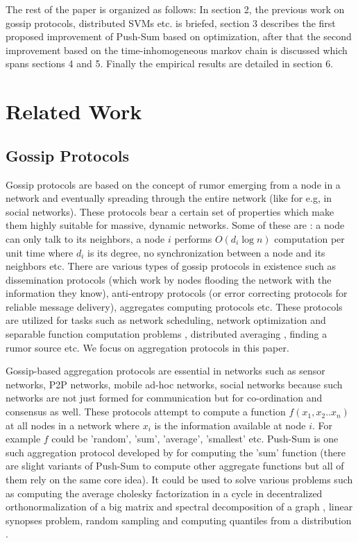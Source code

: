 \documentclass[runningheads,a4paper]{llncs}
\begin{document}
The rest of the paper is organized as follows: In section 2, the previous work on gossip protocols, distributed SVMs etc. is briefed, section 3 describes the first proposed improvement of Push-Sum based on optimization, after that the second improvement based on the time-inhomogeneous markov chain is discussed which spans sections 4 and 5. Finally the empirical results are detailed in section 6.

\section{Related Work}

\subsection{Gossip Protocols}

Gossip protocols are based on the concept of rumor emerging from a node in a network and eventually spreading through the entire network (like for e.g, in social networks). These protocols bear a certain set of properties which make them highly suitable for massive, dynamic networks. Some of these are \citep{Shah}: a node can only talk to its neighbors, a node $i$ performs $O(d_i \log n)$ computation per unit time where $d_i$ is its degree, no synchronization between a node and its neighbors etc. There are various types of gossip protocols in existence such as dissemination protocols (which work by nodes flooding the network with the information they know), anti-entropy protocols (or error correcting protocols for reliable message delivery), aggregates computing protocols etc. These protocols are utilized for tasks such as network scheduling, network optimization and separable function computation problems \citep{Shah}, distributed averaging \cite{rajagopalan2011distributed}, finding a rumor source \cite{shah2011rumors} etc. We focus on aggregation protocols in this paper. 

Gossip-based aggregation protocols are essential in networks such as sensor networks, P2P networks, mobile ad-hoc networks, social networks because such networks are not just formed for communication but for co-ordination and consensus as well. These protocols attempt to compute a function $f(x_1,x_2..x_n)$ at all nodes in a network where $x_i$ is the information available at node $i$. For example $f$ could be 'random', 'sum', 'average', 'smallest' etc. Push-Sum is one such aggregation protocol developed by \citep{Kempe03gossip-basedcomputation} for computing the 'sum' function (there are slight variants of Push-Sum to compute other aggregate functions but all of them rely on the same core idea). It could be used to solve various problems such as computing the average cholesky factorization in a cycle in decentralized orthonormalization of a big matrix and spectral decomposition of a graph \cite{kempe2008decentralized}, linear synopses problem, random sampling and computing quantiles from a distribution \cite{Kempe03gossip-basedcomputation}.
\end{document}
